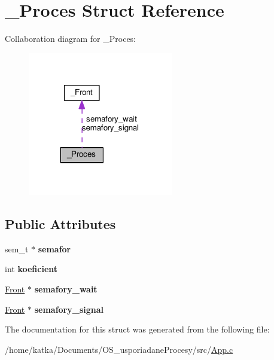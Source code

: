 \hypertarget{struct__Proces}{}\section{\+\_\+\+Proces Struct Reference}
\label{struct__Proces}


Collaboration diagram for \+\_\+\+Proces\+:\nopagebreak
\begin{figure}[H]
\begin{center}
\leavevmode
\includegraphics[width=179pt]{struct__Proces__coll__graph}
\end{center}
\end{figure}
\subsection*{Public Attributes}
\begin{DoxyCompactItemize}
\item 
sem\+\_\+t $\ast$ {\bfseries semafor}\hypertarget{struct__Proces_ae861d8129ec67d9e340f035f371d0d1d}{}\label{struct__Proces_ae861d8129ec67d9e340f035f371d0d1d}

\item 
int {\bfseries koeficient}\hypertarget{struct__Proces_adc9eff4877d9e51470d0a9c386b00c40}{}\label{struct__Proces_adc9eff4877d9e51470d0a9c386b00c40}

\item 
\hyperlink{Front_8h_aeda6f9a18e68a801590717ec948afc22}{Front} $\ast$ {\bfseries semafory\+\_\+wait}\hypertarget{struct__Proces_a084d71b0a72065a85df0f51e9b1b3107}{}\label{struct__Proces_a084d71b0a72065a85df0f51e9b1b3107}

\item 
\hyperlink{Front_8h_aeda6f9a18e68a801590717ec948afc22}{Front} $\ast$ {\bfseries semafory\+\_\+signal}\hypertarget{struct__Proces_acb70bd09f8b74c247a3040236a35c2f3}{}\label{struct__Proces_acb70bd09f8b74c247a3040236a35c2f3}

\end{DoxyCompactItemize}


The documentation for this struct was generated from the following file\+:\begin{DoxyCompactItemize}
\item 
/home/katka/\+Documents/\+O\+S\+\_\+usporiadane\+Procesy/src/\hyperlink{App_8c}{App.\+c}\end{DoxyCompactItemize}
